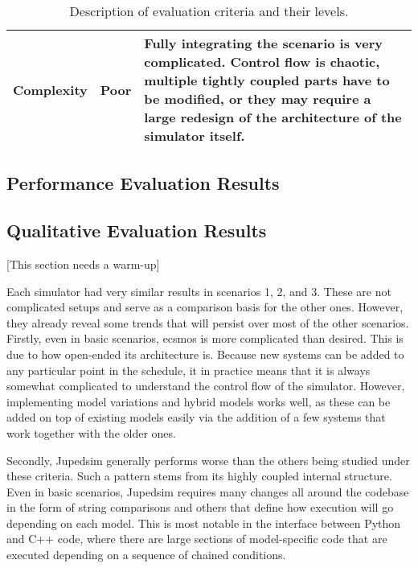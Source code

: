 \documentclass[twoside, 11pt]{article}
\begin{document}
\begin{center}
\begin{table}
\begin{tabularx}{\textwidth}{ | p{2.9cm} | l | X | }
      \\ 
      \hline
      Complexity & Poor & 
      Fully integrating the scenario is very complicated. Control flow is chaotic, multiple tightly coupled parts have to be modified, or they may require a large redesign of the architecture of the simulator itself.
      \\ 
      \hline
    \end{tabularx}
    \caption{Description of evaluation criteria and their levels.}
    \label{table:qualitative-evaluation-criteria}
  \end{table}
\end{center}

\subsection{Performance Evaluation Results}

\subsection{Qualitative Evaluation Results}

[This section needs a warm-up]

Each simulator had very similar results in scenarios 1, 2, and 3. These are not complicated setups and serve as a comparison basis for the other ones. However, they already reveal some trends that will persist over most of the other scenarios. Firstly, even in basic scenarios, \gls{ecsmos} is more complicated than desired. This is due to how open-ended its architecture is. Because new systems can be added to any particular point in the schedule, it in practice means that it is always somewhat complicated to understand the control flow of the simulator. However, implementing model variations and hybrid models works well, as these can be added on top of existing models easily via the addition of a few systems that work together with the older ones.

Secondly, Jupedsim generally performs worse than the others being studied under these criteria. Such a pattern stems from its highly coupled internal structure. Even in basic scenarios, Jupedsim requires many changes all around the codebase in the form of string comparisons and others that define how execution will go depending on each model. This is most notable in the interface between Python and C++ code, where there are large sections of model-specific code that are executed depending on a sequence of chained conditions.
\end{document}
